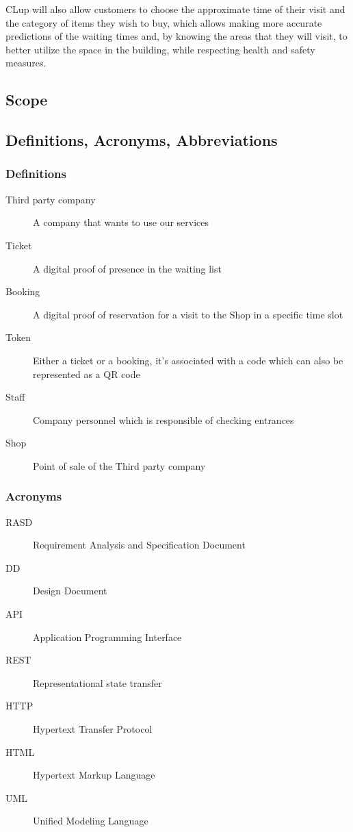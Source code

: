 CLup will also allow customers to choose the approximate time of their visit and the category of items they wish to buy, which allows making more accurate predictions of the waiting times and, by knowing the areas that they will visit, to better utilize the space in the building, while respecting health and safety measures.

\subsection{Scope}

\subsection{Definitions, Acronyms, Abbreviations}
\subsubsection{Definitions}

\begin{description}
    \item [Third party company] A company that wants to use our services
    \item [Ticket] A digital proof of presence in the waiting list
    \item [Booking] A digital proof of reservation for a visit to the Shop in a specific time slot
    \item [Token] Either a ticket or a booking, it's associated with a code which can also be represented as a QR code
    \item [Staff] Company personnel which is responsible of checking entrances
    \item [Shop] Point of sale of the Third party company
\end{description}
\subsubsection{Acronyms}

\begin{description}
    \item [RASD] Requirement Analysis and Specification Document
    \item [DD] Design Document
    \item [API] Application Programming Interface
    \item [REST] Representational state transfer
    \item [HTTP] Hypertext Transfer Protocol
    \item [HTML] Hypertext Markup Language
    \item [UML] Unified Modeling Language
\end{description}
